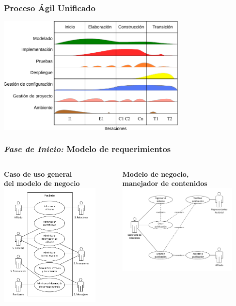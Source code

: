 \documentclass[xcolor=dvipsnames, xcolor=table]{beamer}
\begin{document}
\begin{frame}
    \frametitle{Proceso Ágil Unificado}
    \centering\includegraphics[width=9.5cm]{aup}
\end{frame}

\begin{frame}
    \frametitle{\textit{Fase de Inicio:} Modelo de requerimientos}
    \begin{columns}
      \begin{column}{0.4\textwidth}
        \centering\textbf{\textcolor{color3}{\small Caso de uso general\\ del modelo de negocio}\vspace{2mm}}
        \centering\includegraphics[width=5cm]{CUgeneral}
      \end{column}
      \begin{column}{0.6\textwidth}
        \centering\textbf{\textcolor{color3}{\small Modelo de negocio,\\ manejador de contenidos}\vspace{6mm}}
        \includegraphics[width=6cm]{CUcms}
      \end{column}
    \end{columns}
\end{frame}
\end{document}
